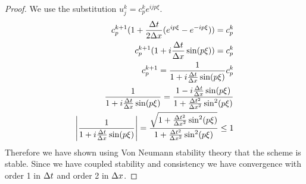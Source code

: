 \documentclass{article}
\begin{document}
\begin{enumerate}[label=\alph*)]
\begin{proof}
        We use the substitution $u_j^k = c_p^ke^{ijp\xi}$. 
        \begin{align*}
            c_p^{k+1}(1 + \frac{\Delta t}{2\Delta x}(e^{ip\xi} - e^{-ip\xi})) = c_p^k\\
            c_p^{k+1}(1 + i\frac{\Delta t}{\Delta x}\sin(p\xi)) = c_p^k\\
            c_p^{k+1} = \frac{1}{1 + i\frac{\Delta t}{\Delta x}\sin(p\xi)}c_p^k\\
            \frac{1}{1 + i\frac{\Delta t}{\Delta x}\sin(p\xi)} = \frac{1 - i\frac{\Delta t}{\Delta x}\sin(p\xi)}{1 +
            \frac{\Delta t^2}{\Delta x^2}\sin^2(p\xi)}\\
            \left|\frac{1}{1 + i\frac{\Delta t}{\Delta x}\sin(p\xi)}\right| = \frac{\sqrt{1 +
            \frac{\Delta t^2}{\Delta x^2}\sin^2(p\xi)}}{1 +
            \frac{\Delta t^2}{\Delta x^2}\sin^2(p\xi)} \le 1
        \end{align*}
        Therefore we have shown using Von Neumann stability theory that the
        scheme is stable. Since we have coupled stability and consistency we
        have convergence with order 1 in $\Delta t$ and order 2 in $\Delta x$. 
    \end{proof}
\end{enumerate}
\end{document}
